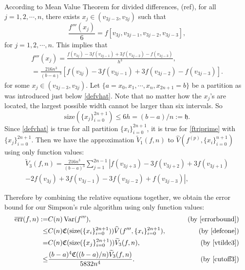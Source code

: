 \documentclass{iitthesis}
\DeclareMathOperator{\Var}{Var}
\theoremstyle{definition}
\theoremstyle{remark}
\begin{document}
According to Mean Value Theorem for divided differences, (ref), for all $j=1,2,\cdots,n$, there exists $x_j\in (v_{3j-3},v_{3j})$ such that
\begin{equation*}
    \frac{f'''(x_j)}{6}=f[v_{3j},v_{3j-1},v_{3j-2},v_{3j-3}],
\end{equation*}
for $j = 1, 2, \cdots, n.$ This implies that
\begin{multline}\label{ftriprime}
  f'''(x_j)=\frac{f(v_{3j})-3f(v_{3j-1})+3f(v_{3j-2})-f(v_{3j-3})}{h^3},\\=\frac{216n^3}{(b-a)^3}[f(v_{3j})-3f(v_{3j-1})+3f(v_{3j-2})-f(v_{3j-3})].
\end{multline}
for some $x_j\in (v_{3j-3},v_{3j})$. Let $\{a=x_{0}, x_{1},\cdots,x_{n},x_{2n+1}=b\}$ be a partition as was introduced just below \eqref{defvhat}. Note that no matter how the $x_j$'s are located, the largest possible width cannot be larger than six intervals. So 
\begin{equation}\label{cutoff3}
    \text{size}(\{x_j\}_{i=0}^{2n+1})\leq 6h=(b-a)/n:=\mathfrak{h}.
\end{equation}
Since \eqref{defvhat} is true for all partition $\{x_i\}_{i=0}^{2n+1}$, it is true for \eqref{ftriprime} with $\{x_j\}_{i=0}^{2n+1}$. Then we have the approximation $\widetilde{V}_1(f,n)$ to $\widehat{V}(f^{(p)},\{x_i\}_{i=0}^{n+1})$ using only function values:
\begin{multline}\label{vtilde3}
\widetilde{V}_3(f,n)=\frac{216n^3}{(b-a)^3}\sum_{j=1}^{2n-1}\left|f(v_{3j+3})-3f(v_{3j+2})+3f(v_{3j+1})\right.\\\left.-2f(v_{3j})+3f(v_{3j-1})-3f(v_{3j-2})+f(v_{3j-3})\right|,
\end{multline}

Therefore by combining the relative equations together, we obtain the error bound for our Simpson's rule algorithm using only function values:
\begin{align}\label{errorsimcone}
\nonumber  \overline{\text{err}}(f,n):=&C(n)\Var(f'''),\qquad &\text{ (by \eqref{errorbound})}\\
\nonumber  \leq & C(n)\mathfrak{C}(\text{size}(\{x_i\}_{i=0}^{2n+1}))\widehat{V}(f''',\{x_i\}_{i=0}^{2n+1}), \qquad &\text{ (by \eqref{defcone})}\\
\nonumber  =& C(n)\mathfrak{C}(\text{size}(\{x_j\}_{i=0}^{2n+1}))\widetilde{V}_3(f,n), \qquad &\text{ (by \eqref{vtilde3})}\\
  \leq & \frac{(b-a)^4\mathfrak{C}((b-a)/n)\widetilde{V}_3(f,n)}{5832n^4}.\qquad &\text{ (by \eqref{cutoff3})}
\end{align}
\end{document}
